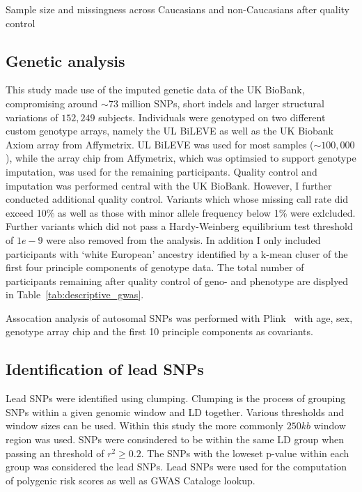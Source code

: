 \begin{table}[!htpb]
	\centering
	\resizebox{\textwidth}{!}{}
  \caption{Sample size and missingness across Caucasians and non-Caucasians after quality control}\label{tab:descriptive_gwas} 
\end{table}

\subsection{Genetic analysis}
\label{sub:genetic_analysis}
This study made use of the imputed genetic data of the UK BioBank, compromising around $\sim73$ million SNPs, short indels and larger structural variations of $152,249$ subjects.
Individuals were genotyped on two different custom genotype arrays, namely the UL BiLEVE as well as the UK Biobank Axiom array from Affymetrix. 
UL BiLEVE was used for most samples ($\sim100,000$), while the array chip from Affymetrix, which was optimsied to support genotype imputation, was used for the remaining participants. 
Quality control and imputation was performed central with the UK BioBank.
However, I further conducted additional quality control.
Variants which whose missing call rate did exceed 10\% as well as those with minor allele frequency below 1\% were exlcluded.
Further variants which did not pass a Hardy-Weinberg equilibrium test threshold of $1e-9$ were also removed from the analysis.
In addition I only included participants with `white European' ancestry identified by a k-mean cluser of the first four principle components of genotype data.
The total number of participants remaining after quality control of geno- and phenotype are displyed in Table~\ref{tab:descriptive_gwas}.

Assocation analysis of autosomal SNPs was performed with Plink~\cite{Purcell2007,Chang2015} with age, sex, genotype array chip and the first 10 principle components as covariants.

\subsection{Identification of lead SNPs}
\label{sub:Clumping}

Lead SNPs were identified using clumping.
Clumping is the process of grouping SNPs within a given genomic window and LD together.
Various thresholds and window sizes can be used.
Within this study the more commonly $250kb$ window region was used.
SNPs were consindered to be within the same LD group when passing an threshold of $r^2 \ge 0.2$.
The SNPs with the loweset p-value within each group was considered the lead SNPs.
Lead SNPs were used for the computation of polygenic risk scores as well as GWAS Cataloge lookup.

